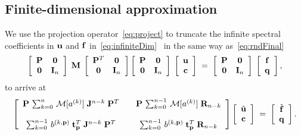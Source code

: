 \documentclass[%
secnumarabic,%
 amssymb, amsmath,%
 aps,prf,superscriptaddress,longbibliography
frontmatterverbose,
]{revtex4-2}
\begin{document}
\subsection{Finite-dimensional approximation}
We use the projection operator~\eqref{eq:project} to truncate the infinite spectral coefficients in $\mathbf{u}$ and $\mathbf{f}$ in~\eqref{eq:infiniteDim}~\cite[Eq. 2.9, also last paragraph of Section 2.4]{OlvTowSIAM2013} in the same way as~\eqref{eq:rndFinal} 
\begin{equation*}
  \left[\begin{array}{cc}
    \mathbf{P} & \mathbf 0\\
    \mathbf 0 & \mathbf{I}_n
  \end{array}\right]\;\mathbf{M}\;\left[\begin{array}{cc}
    \mathbf{P}^T & \mathbf 0\\
    \mathbf 0 & \mathbf{I}_n
  \end{array}\right]\left[\begin{array}{cc}
    \mathbf{P} & \mathbf 0\\
    \mathbf 0 & \mathbf{I}_n
  \end{array}\right]\;\left[\begin{array}{c}
    \mathbf{u}\\
    \mathbf c
  \end{array}\right]\;= \; \left[\begin{array}{cc}
    \mathbf{P} & \mathbf 0\\
    \mathbf 0 & \mathbf{I}_n
  \end{array}\right]\;\left[\begin{array}{c}
    \mathbf{f}\\
    \mathbf q
  \end{array}\right],
\end{equation*}
to arrive at
\begin{equation}\label{eq:finiteDim}
  \left[
  \begin{array}{cccc}
    \mathbf{P}\,\sum_{k = 0}^{n}\, \mathcal M [a^{(k)}]\; \mathbf J^{n-k}\;\mathbf{P}^T &  &\mathbf{P}\,\sum_{k = 0}^{n - 1}\,\mathcal M [a^{(k)}]\; \mathbf R_{n-k} \\ \\ 
    \sum_{k = 0}^{n-1}\,b^{(k,\mathbf p)}\;\mathbf t^T_{ \mathbf p}\;\mathbf J^{n-k}\;\mathbf{P}^T & & \sum_{k = 0}^{n-1}\, b^{(k,\mathbf p)}\;\mathbf t^T_{\mathbf p}\;\mathbf R_{n-k}
  \end{array}\right]\left[\begin{array}{c}
    \hat{\mathbf{u}}\\
    \mathbf{c}
  \end{array}\right] \;=\; \left[\begin{array}{c}
     \hat{\mathbf{f}}\\
    \mathbf{q}
  \end{array}\right].
\end{equation} 
\end{document}
